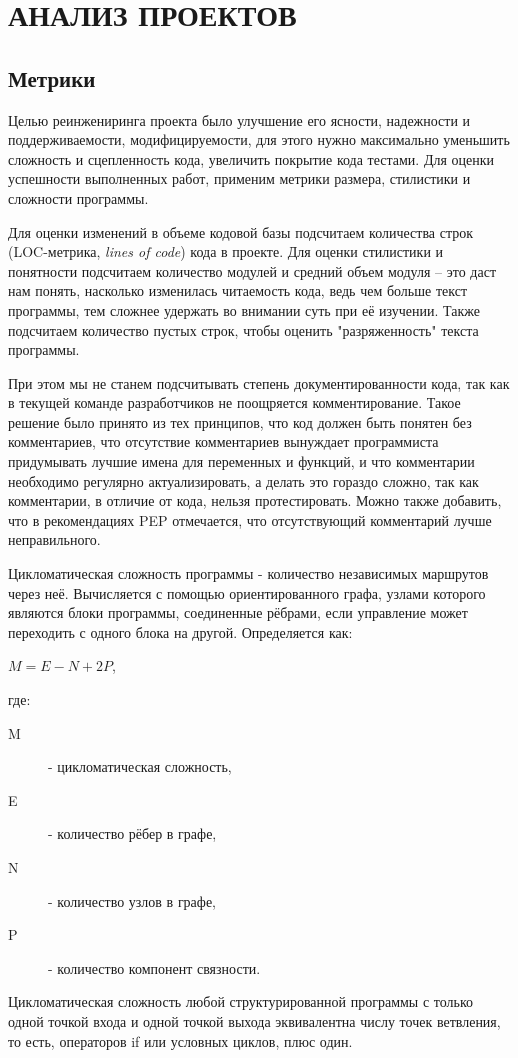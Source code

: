 \section{АНАЛИЗ ПРОЕКТОВ}
    \subsection{Метрики}
    Целью реинжениринга проекта было улучшение его ясности, надежности и поддерживаемости,
    модифицируемости, для этого нужно максимально уменьшить сложность и сцепленность кода,
    увеличить покрытие кода тестами.
    Для оценки успешности выполненных работ, применим метрики размера,
    стилистики и сложности программы.
    \cite{clearcode.habr}

    Для оценки изменений в объеме кодовой базы подсчитаем количества строк
    (LOC-метрика, \textit{lines of code}) кода в проекте.
    Для оценки стилистики и понятности подсчитаем количество модулей и средний
    объем модуля -- это даст нам понять, насколько изменилась читаемость кода,
    ведь чем больше текст программы, тем сложнее удержать во внимании суть при 
    её изучении. Также подсчитаем количество пустых строк, чтобы оценить
    "разряженность" текста программы.

    При этом мы не станем подсчитывать степень документированности кода,
    так как в текущей команде разработчиков не поощряется комментирование.
    Такое решение было принято из тех принципов, что код должен быть понятен без
    комментариев, что отсутствие комментариев вынуждает программиста придумывать
    лучшие имена для переменных и функций,
    и что комментарии необходимо регулярно актуализировать, а делать это
    гораздо сложно, так как комментарии, в отличие от кода, нельзя
    протестировать.
    Можно также добавить, что в рекомендациях PEP отмечается, что отсутствующий
    комментарий лучше неправильного.

    Цикломатическая сложность программы - количество независимых маршрутов через
    неё. Вычисляется с помощью ориентированного графа, узлами которого являются
    блоки программы, соединенные рёбрами, если управление может переходить с
    одного блока на другой. Определяется как:
    \newpage

    \begin{center}
        $ M = E - N + 2P $, 
    \end{center}
    где:
    \begin{description}
        \item [M] - цикломатическая сложность,
        \item [E] - количество рёбер в графе,
        \item [N] - количество узлов в графе,
        \item [P] - количество компонент связности.
    \end{description}
    Цикломатическая сложность любой структурированной программы с только одной
    точкой входа и одной точкой выхода эквивалентна числу точек ветвления,
    то есть, операторов if или условных циклов, плюс один.
    \cite{complexity.McCabe}

